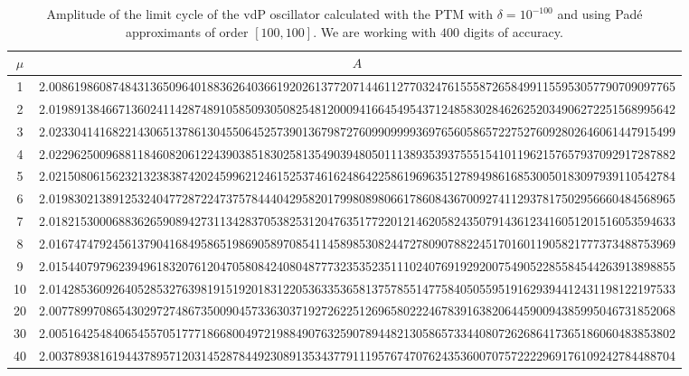 \documentclass[final]{article}
\begin{document}
\begin{table}
	\caption{Amplitude of the limit cycle of the vdP oscillator calculated with the PTM with $\delta=10^{-100}$ and using Pad\'e approximants of order $[100,100]$. We are working with $400$ digits of accuracy. }
	\bigskip
	\label{table_A_vdP}
	\begin{center}
		\begin{tabular}{|c|c|}
			\hline
			$\mu$ &   $A$    \\
			\hline
			1   &  2.008619860874843136509640188362640366192026137720714461127703247615558726584991155953057790709097765 \\
			2   &  2.019891384667136024114287489105850930508254812000941664549543712485830284626252034906272251568995642 \\
			3   &  2.023304141682214306513786130455064525739013679872760990999936976560586572275276092802646061447915499 \\
			4   &  2.022962500968811846082061224390385183025813549039480501113893539375551541011962157657937092917287882 \\
			5   &  2.021508061562321323838742024599621246152537461624864225861969635127894986168530050183097939110542784 \\
			6   &  2.019830213891253240477287224737578444042958201799808980661786084367009274112937817502956660484568965 \\
			7   &  2.018215300068836265908942731134283705382531204763517722012146205824350791436123416051201516053594633 \\
			8   &  2.016747479245613790416849586519869058970854114589853082447278090788224517016011905821777373488753969 \\
			9   &  2.015440797962394961832076120470580842408048777323535235111024076919292007549052285584544263913898855 \\
			10  &  2.014285360926405285327639819151920183122053633536581375785514775840505595191629394412431198122197533 \\
			20  &  2.007789970865430297274867350090457336303719272622512696580222467839163820644590094385995046731852068 \\
			30  &  2.005164254840654557051777186680049721988490763259078944821305865733440807262686417365186060483853802 \\
			40  &  2.003789381619443789571203145287844923089135343779111957674707624353600707572222969176109242784488704 \\

\end{tabular}
\end{center}
\end{table}
\end{document}
